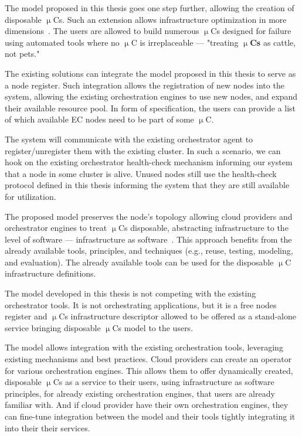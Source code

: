 The model proposed in this thesis goes one step further, allowing the creation of disposable $\upmu$Cs. Such an extension allows infrastructure optimization in more dimensions~\cite{ForestieroMMPS14}. The users are allowed to build numerous $\upmu$Cs designed for failure using automated tools where no $\upmu$C is irreplaceable --- "treating \textbf{$\upmu$Cs} as cattle, not pets."

The existing solutions can integrate the model proposed in this thesis to serve as a node register. Such integration allows the registration of new nodes into the system, allowing the existing orchestration engines to use new nodes, and expand their available resource pool. In form of specification, the users can provide a list of which available EC nodes need to be part of some $\upmu$C. 

The system will communicate with the existing orchestrator agent to register/unregister them with the existing cluster. In such a scenario, we can hook on the existing orchestrator health-check mechanism informing our system that a node in some cluster is alive. Unused nodes still use the health-check protocol defined in this thesis informing the system that they are still available for utilization.

The proposed model preserves the node's topology allowing cloud providers and orchestrator engines to treat $\upmu$Cs disposable, abstracting infrastructure to the level of software --- infrastructure as software~{\cite{Fitzgerald}}. This approach benefits from the already available tools, principles, and techniques (e.g., reuse, testing, modeling, and evaluation). The already available tools can be used for the disposable $\upmu$C infrastructure definitions.

The model developed in this thesis is not competing with the existing orchestrator tools. It is not orchestrating applications, but it is a free nodes register and $\upmu$Cs infrastructure descriptor allowed to be offered as a stand-alone service bringing disposable $\upmu$Cs model to the users. 

The model allows integration with the existing orchestration tools, leveraging existing mechanisms and best practices. Cloud providers can create an operator for various orchestration engines. This allows them to offer dynamically created, disposable $\upmu$Cs as a service to their users, using infrastructure as software principles, for already existing orchestration engines, that users are already familiar with. And if cloud provider have their own orchestration engines, they can fine-tune integration between the model and their tools tightly integrating it into their their services.
%
%